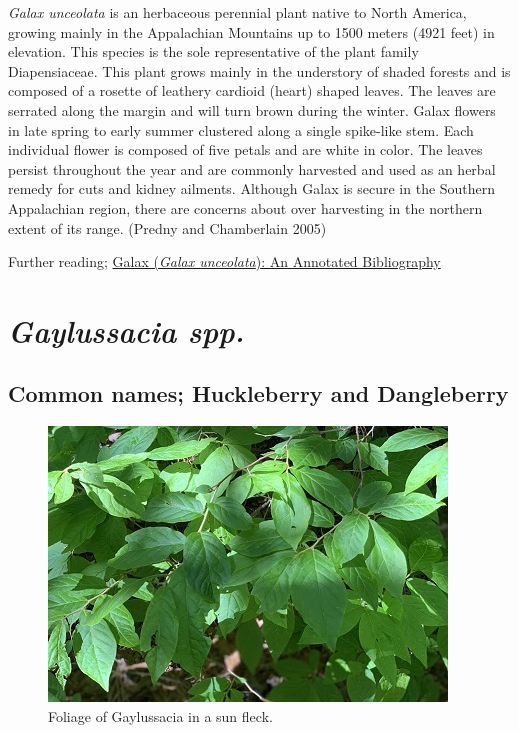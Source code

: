 \documentclass[
]{article}
\begin{document}
\emph{Galax unceolata} is an herbaceous perennial plant native to North America, growing mainly in the Appalachian Mountains up to 1500 meters (4921 feet) in elevation. This species is the sole representative of the plant family Diapensiaceae. This plant grows mainly in the understory of shaded forests and is composed of a rosette of leathery cardioid (heart) shaped leaves. The leaves are serrated along the margin and will turn brown during the winter. Galax flowers in late spring to early summer clustered along a single spike-like stem. Each individual flower is composed of five petals and are white in color. The leaves persist throughout the year and are commonly harvested and used as an herbal remedy for cuts and kidney ailments. Although Galax is secure in the Southern Appalachian region, there are concerns about over harvesting in the northern extent of its range. (Predny and Chamberlain 2005)

Further reading; \href{https://www.srs.fs.usda.gov/pubs/gtr/gtr_srs087.pdf}{Galax (\emph{Galax unceolata}): An Annotated Bibliography}

\hypertarget{gaylussacia-spp.}{%
\section{\texorpdfstring{\emph{Gaylussacia spp.}}{Gaylussacia spp.}}\label{gaylussacia-spp.}}

\hypertarget{common-names-huckleberry-and-dangleberry}{%
\subsection{Common names; Huckleberry and Dangleberry}\label{common-names-huckleberry-and-dangleberry}}

\begin{figure}

{\centering \includegraphics[width=0.5\linewidth]{galuss} 

}

\caption{Foliage of Gaylussacia in a sun fleck.}\label{fig:gayluss}
\end{figure}
\end{document}
